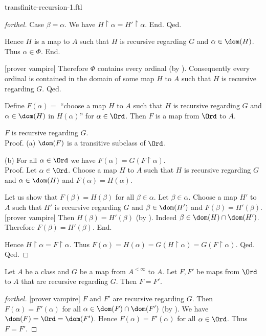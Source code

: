 \documentclass{naproche-library}
\begin{document}
\begin{smodule}{transfinite-recursion-1.ftl}
\begin{proof}[forthel]
          Case $\beta = \alpha$.
            We have $H \restriction \alpha = H' \restriction \alpha$.
          End.
        Qed.

        Hence $H$ is a map to $A$ such that $H$ is recursive regarding $G$ and $\alpha \in \dom(H)$.
        Thus $\alpha \in \Phi$.
      End.

      [prover vampire]
      Therefore $\Phi$ contains every ordinal (by ).
      Consequently every ordinal is contained in the domain of some map $H$ to $A$ such that $H$ is recursive regarding $G$.
    Qed.

    Define $F(\alpha) =$ ``choose a map $H$ to $A$ such that $H$ is recursive regarding $G$ and $\alpha \in \dom(H)$ in $H(\alpha)$'' for $\alpha \in \Ord$.
    Then $F$ is a map from $\Ord$ to $A$.

    $F$ is recursive regarding $G$. \\
    Proof.
      (a) $\dom(F)$ is a transitive subclass of $\Ord$.

      (b) For all $\alpha \in \Ord$ we have $F(\alpha) = G(F \restriction \alpha)$. \\
      Proof.
        Let $\alpha \in \Ord$.
        Choose a map $H$ to $A$ such that $H$ is recursive regarding $G$ and $\alpha \in \dom(H)$ and $F(\alpha) = H(\alpha)$.

        Let us show that $F(\beta) = H(\beta)$ for all $\beta \in \alpha$.
          Let $\beta \in \alpha$.
          Choose a map $H'$ to $A$ such that $H'$ is recursive regarding $G$ and $\beta \in \dom(H')$ and $F(\beta) = H'(\beta)$.
          [prover vampire]
          Then $H(\beta) = H'(\beta)$ (by ).
          Indeed $\beta \in \dom(H) \cap \dom(H')$.
          Therefore $F(\beta) = H'(\beta)$.
        End.

        Hence $H \restriction \alpha = F \restriction \alpha$.
        Thus $F(\alpha)
          = H(\alpha)
          = G(H \restriction \alpha)
          = G(F \restriction \alpha)$.
      Qed.
    Qed.
  \end{proof}
  
  \begin{theorem*}[forthel,title=Transfinite Recursion Theorem: Uniqueness,id=transfinite-recursion_uniqueness]
    Let $A$ be a class and $G$ be a map from $A^{< \infty}$ to $A$.
    Let $F, F'$ be maps from $\Ord$ to $A$ that are recursive regarding $G$.
    Then $F = F'$.
  \end{theorem*}
  \begin{proof}[forthel]
    [prover vampire]
    $F$ and $F'$ are recursive regarding $G$.
    Then $F(\alpha) = F'(\alpha)$ for all $\alpha \in \dom(F) \cap \dom(F')$ (by ).
    We have $\dom(F) = \Ord = \dom(F')$.
    Hence $F(\alpha) = F'(\alpha)$ for all $\alpha \in \Ord$.
    Thus $F = F'$.
  \end{proof}
\end{smodule}
\end{document}
